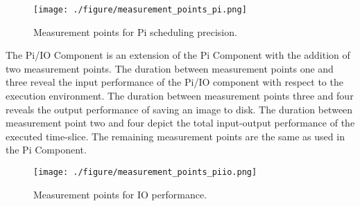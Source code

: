 
\begin{figure}[ht]
\centering
     \texttt{[image: ./figure/measurement\_points\_pi.png]}
      \caption{Measurement points for Pi scheduling precision.}
       \label{pi_measure}
\end{figure}

The Pi/IO Component is an extension of the Pi Component with the addition of two measurement points. The duration between measurement points one and three reveal the input performance of the Pi/IO component with respect to the execution environment. The duration between measurement points three and four reveals the output performance of saving an image to disk. The duration between measurement point two and four depict the total input-output performance of the executed time-slice. The remaining measurement points are the same as used in the Pi Component. 



\begin{figure}[ht]
\centering
     \texttt{[image: ./figure/measurement\_points\_piio.png]}
      \caption{Measurement points for IO performance.}
       \label{piio_measure}
\end{figure}


